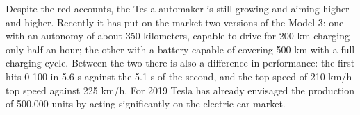 Despite the red accounts, the Tesla automaker is still growing and aiming higher and higher. Recently it has put on the market two versions of the Model 3: one with an autonomy of about 350 kilometers, capable to drive for 200 km charging only half an hour; the other with a battery capable of covering 500 km with a full charging cycle. Between the two there is also a difference in performance: the first hits 0-100 in 5.6 s against the 5.1 s of the second, and the top speed of 210 km/h top speed against 225 km/h. For 2019 Tesla has already envisaged the production of 500,000 units by acting significantly on the electric car market.


